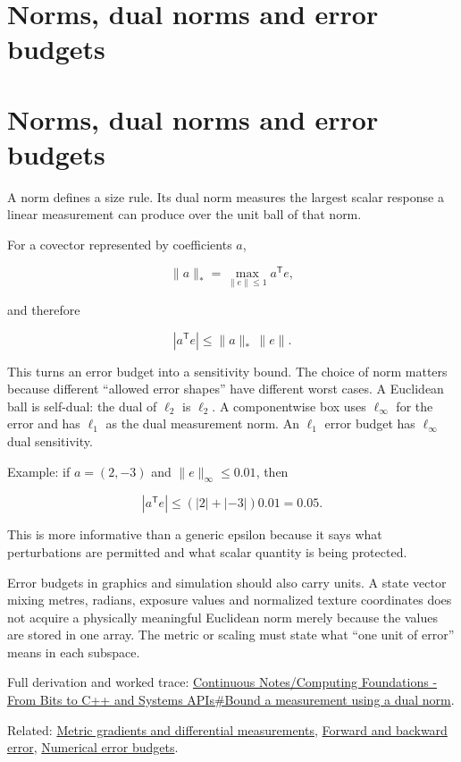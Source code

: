 \hypertarget{appendix-d6d9dbbe3c14}{}
\section*{Norms, dual norms and error budgets}
\section{Norms, dual norms and error budgets}\label{appendix-d6d9dbbe3c14-norms-dual-norms-and-error-budgets}

A norm defines a size rule. Its dual norm measures the largest scalar response a linear measurement can produce over the unit ball of that norm.

For a covector represented by coefficients \(a\),

\[
\|a\|_* = \max_{\|e\|\le 1} a^{\mathsf T}e,
\]

and therefore

\[
|a^{\mathsf T}e|\le \|a\|_*\,\|e\|.
\]

This turns an error budget into a sensitivity bound. The choice of norm matters because different ``allowed error shapes'' have different worst cases. A Euclidean ball is self-dual: the dual of \(\ell_2\) is \(\ell_2\). A componentwise box uses \(\ell_\infty\) for the error and has \(\ell_1\) as the dual measurement norm. An \(\ell_1\) error budget has \(\ell_\infty\) dual sensitivity.

Example: if \(a=(2,-3)\) and \(\|e\|_\infty\le0.01\), then

\[
|a^{\mathsf T}e|
\le (|2|+|{-3}|)0.01
=0.05.
\]

This is more informative than a generic epsilon because it says what perturbations are permitted and what scalar quantity is being protected.

Error budgets in graphics and simulation should also carry units. A state vector mixing metres, radians, exposure values and normalized texture coordinates does not acquire a physically meaningful Euclidean norm merely because the values are stored in one array. The metric or scaling must state what ``one unit of error'' means in each subspace.

Full derivation and worked trace: \hyperref[01-foundations-i-ch017-bound-a-measurement-using-a-dual-norm]{Continuous Notes/Computing Foundations - From Bits to C++ and Systems APIs\#Bound a measurement using a dual norm}.

Related: \hyperref[appendix-f4acdb1d5563]{Metric gradients and differential measurements}, \hyperref[appendix-a7fbaf6d1b1c]{Forward and backward error}, \hyperref[appendix-31b8c295e05f]{Numerical error budgets}.

